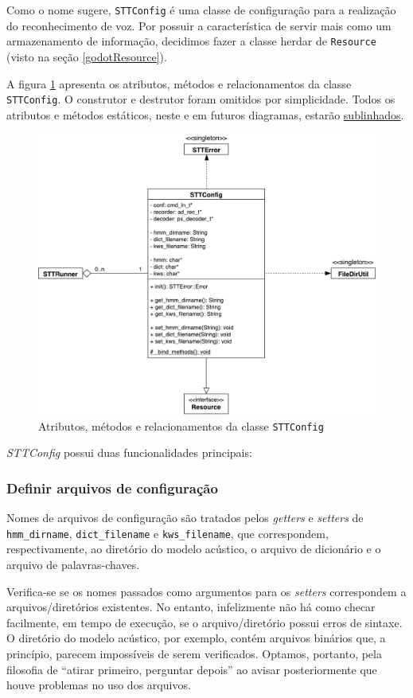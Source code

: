 Como o nome sugere, \texttt{STTConfig} é uma classe de configuração para a realização do reconhecimento de voz. Por possuir a característica de servir mais como um armazenamento de informação, decidimos fazer a classe herdar de \texttt{Resource} (visto na seção \ref{godotResource}).

A figura \ref{stt-config-diagram} apresenta os atributos, métodos e relacionamentos da classe \texttt{STTConfig}. O construtor e destrutor foram omitidos por simplicidade. Todos os atributos e métodos estáticos, neste e em futuros diagramas, estarão \underline{sublinhados}.

\begin{figure}[H]
  \centering
  \includegraphics[width=.9\textwidth]{image/stt-config.pdf}
  \caption{Atributos, métodos e relacionamentos da classe \texttt{STTConfig}}
  \label{stt-config-diagram}
\end{figure}

\textit{STTConfig} possui duas funcionalidades principais:

\subsubsection{Definir arquivos de configuração}

Nomes de arquivos de configuração são tratados pelos \textit{getters} e \textit{setters} de \texttt{hmm\_dirname}, \texttt{dict\_filename} e \texttt{kws\_filename}, que correspondem, respectivamente, ao diretório do modelo acústico, o arquivo de dicionário e o arquivo de palavras-chaves.

Verifica-se se os nomes passados como argumentos para os \textit{setters} correspondem a arquivos/diretórios existentes. No entanto, infelizmente não há como checar facilmente, em tempo de execução, se o arquivo/diretório possui erros de sintaxe. O diretório do modelo acústico, por exemplo, contém arquivos binários que, a princípio, parecem impossíveis de serem verificados. Optamos, portanto, pela filosofia de ``atirar primeiro, perguntar depois'' ao avisar posteriormente que houve problemas no uso dos arquivos.

